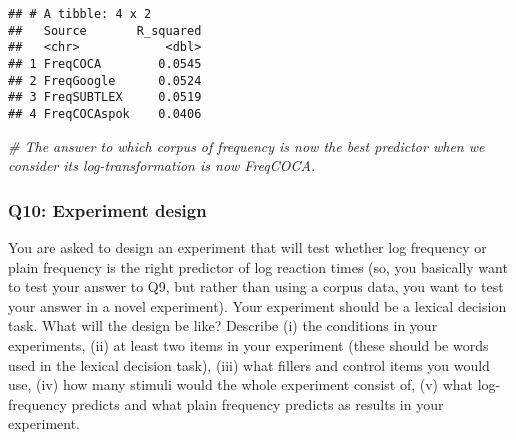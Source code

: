 \documentclass[
]{article}
\newenvironment{Shaded}{\begin{snugshade}}{\end{snugshade}}
\newcommand{\AttributeTok}[1]{\textcolor[rgb]{0.13,0.29,0.53}{#1}}
\newcommand{\CommentTok}[1]{\textcolor[rgb]{0.56,0.35,0.01}{\textit{#1}}}
\newcommand{\FunctionTok}[1]{\textcolor[rgb]{0.13,0.29,0.53}{\textbf{#1}}}
\newcommand{\NormalTok}[1]{#1}
\newcommand{\OtherTok}[1]{\textcolor[rgb]{0.56,0.35,0.01}{#1}}
\newcommand{\SpecialCharTok}[1]{\textcolor[rgb]{0.81,0.36,0.00}{\textbf{#1}}}
\newcommand{\StringTok}[1]{\textcolor[rgb]{0.31,0.60,0.02}{#1}}
\begin{document}
\begin{Shaded}
\end{Shaded}

\begin{verbatim}
## # A tibble: 4 x 2
##   Source       R_squared
##   <chr>            <dbl>
## 1 FreqCOCA        0.0545
## 2 FreqGoogle      0.0524
## 3 FreqSUBTLEX     0.0519
## 4 FreqCOCAspok    0.0406
\end{verbatim}

\begin{Shaded}
\begin{Highlighting}[]
\CommentTok{\# The answer to which corpus of frequency is now the best predictor when we consider its log{-}transformation is now FreqCOCA.}
\end{Highlighting}
\end{Shaded}

\hypertarget{q10-experiment-design}{%
\subsubsection{Q10: Experiment design}\label{q10-experiment-design}}

You are asked to design an experiment that will test whether log
frequency or plain frequency is the right predictor of log reaction
times (so, you basically want to test your answer to Q9, but rather than
using a corpus data, you want to test your answer in a novel
experiment). Your experiment should be a lexical decision task. What
will the design be like? Describe (i) the conditions in your
experiments, (ii) at least two items in your experiment (these should be
words used in the lexical decision task), (iii) what fillers and control
items you would use, (iv) how many stimuli would the whole experiment
consist of, (v) what log-frequency predicts and what plain frequency
predicts as results in your experiment.
\end{document}
